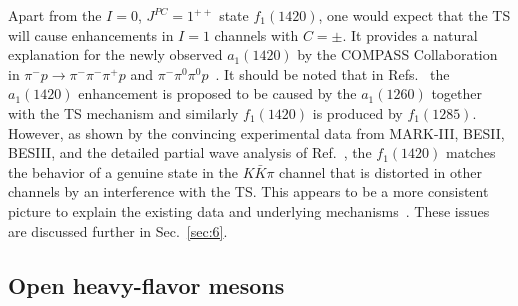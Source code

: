 Apart from the $I=0$, $J^{PC}=1^{++}$ state $f_1(1420)$, one would expect that
the TS will cause enhancements in $I=1$ channels with $C=\pm$. It provides a
natural explanation for the newly observed
 $a_1(1420)$ by the COMPASS Collaboration~\cite{Adolph:2015pws} in $\pi^-p\to
\pi^-\pi^-\pi^+ p$ and $\pi^-\pi^0\pi^0 p$~\cite{Liu:2015taa,Ketzer:2015tqa}. It
should be noted that in
Refs.~\cite{Aceti:2016yeb,Cheng:2016hxi,Debastiani:2016xgg}  the $a_1(1420)$
enhancement is proposed to be caused by the $a_1(1260)$ together with the TS
mechanism and similarly $f_1(1420)$ is produced by $f_1(1285)$.
However, as shown by the convincing experimental data from MARK-III, BESII,
BESIII, and the detailed partial wave analysis of Ref.~\cite{Wu:2012pg}, the
$f_1(1420)$ matches the behavior of a genuine state in the $K\bar{K}\pi$ channel
that is distorted  in other channels by an interference with
 the TS.
This appears to be a more consistent picture to explain the existing data and
underlying mechanisms~\cite{Zhao:2017wey}. These issues are discussed further in
Sec.~\ref{sec:6}.


\subsection{{Open heavy-flavor mesons}} 



